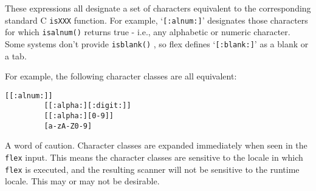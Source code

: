 \documentclass[openany,oneside]{book}
\begin{document}
These expressions all designate a set of characters equivalent to the
corresponding standard C \verb`isXXX` function.  For example,
‘\verb`[:alnum:]`’ designates those characters for which \verb`isalnum()` returns true - i.e., any alphabetic or numeric character.  Some systems
don't provide \verb`isblank()` , so flex defines ‘\verb`[:blank:]`’ as a
blank or a tab.

For example, the following character classes are all equivalent:


\begin{verbatim}
[[:alnum:]]
         [[:alpha:][:digit:]]
         [[:alpha:][0-9]]
         [a-zA-Z0-9]
\end{verbatim}


A word of caution. Character classes are expanded immediately when seen in the \verb`flex` input. 
This means the character classes are sensitive to the locale in which \verb`flex` is executed, and the resulting scanner will not be sensitive to the runtime locale. 
This may or may not be desirable.
\end{document}

